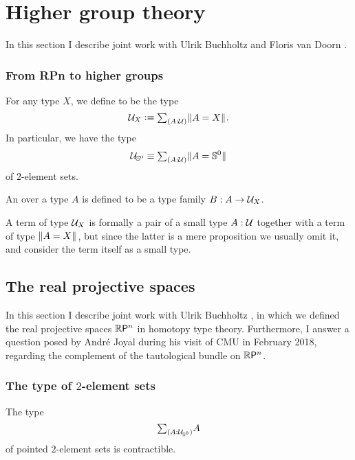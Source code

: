 \chapter{Higher group theory}
In this section I describe joint work with Ulrik Buchholtz and Floris van Doorn \cite{highergroups}.

\subsection{From RPn to higher groups}
\begin{defn}
For any type $X$, we define  to be the type \[\UU_X\defeq\sm{A:\UU}\brck{A=X}.\] In particular, we have the type \[\UU_{\sphere{0}}\jdeq\sm{A:\UU}\brck{A={\sphere{0}}}\] of $2$\nobreakdash-element sets.

An  over a type $A$ is defined to be a type family $B:A\to\mathcal{U}_X$. 
\end{defn}

A term of type $\mathcal{U}_X$ is formally a pair of a small type $A:\mathcal{U}$ together with a term of type $\Vert A=X\Vert_{}$, but since the latter is a mere proposition we usually omit it, and consider the term itself as a small type.

\section{The real projective spaces}
In this section I describe joint work with Ulrik Buchholtz \cite{realprojective}, in which we defined the real projective spaces $\mathbb{R}\mathsf{P}^{n}$ in homotopy type theory. Furthermore, I answer a question posed by André Joyal during his visit of CMU in February 2018, regarding the complement of the tautological bundle on $\mathbb{R}\mathsf{P}^{n}$.

\subsection{The type of $2$-element sets}
\begin{thm}\label{thm:ptd_2elt_sets}
The type
\begin{equation*}
\sm{A:\UU_{\sphere{0}}}A
\end{equation*}
of pointed $2$\nobreakdash-element sets is contractible.
\end{thm}


